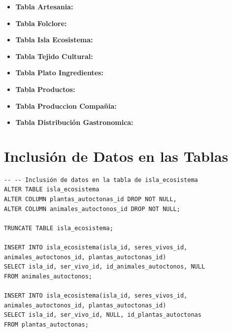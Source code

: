 \documentclass[11pt]{report}
\begin{document}
\begin{itemize}
    \item \textbf{Tabla Artesania:}
    \lstset{style=mystyle}
    

    \item \textbf{Tabla Folclore:}
    \lstset{style=mystyle}
    

    \item \textbf{Tabla Isla Ecosistema:}
    \lstset{style=mystyle}
    

    \item \textbf{Tabla Tejido Cultural:}
    \lstset{style=mystyle}
    

    \item \textbf{Tabla Plato Ingredientes:}
    \lstset{style=mystyle}
    

    \item \textbf{Tabla Productos:}
    \lstset{style=mystyle}
    

    \item \textbf{Tabla Produccion Compañia:}
    \lstset{style=mystyle}
    

    \item \textbf{Tabla Distribución Gastronomica:}
    \lstset{style=mystyle}
    
\end{itemize}


\section{Inclusión de Datos en las Tablas}
\begin{verbatim}
-- -- Inclusión de datos en la tabla de isla_ecosistema
ALTER TABLE isla_ecosistema
ALTER COLUMN plantas_autoctonas_id DROP NOT NULL,
ALTER COLUMN animales_autoctonos_id DROP NOT NULL;

TRUNCATE TABLE isla_ecosistema;

INSERT INTO isla_ecosistema(isla_id, seres_vivos_id, animales_autoctonos_id, plantas_autoctonas_id)
SELECT isla_id, ser_vivo_id, id_animales_autoctonos, NULL
FROM animales_autoctonos;

INSERT INTO isla_ecosistema(isla_id, seres_vivos_id, animales_autoctonos_id, plantas_autoctonas_id)
SELECT isla_id, ser_vivo_id, NULL, id_plantas_autoctonas
FROM plantas_autoctonas;
\end{verbatim}
\end{document}
